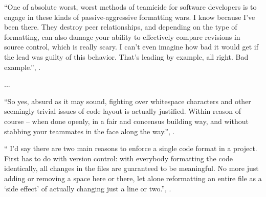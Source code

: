 \begin{enumerate}[leftmargin=*]
        \begin{myquote}
        ``One of absolute worst, worst methods of teamicide for software developers is to engage
        in these kinds of passive-aggressive formatting wars. I know because I've been there.
        They destroy peer relationships, and depending on the type of formatting, can also damage
        your ability to effectively compare revisions in source control, which is really scary.
        I can't even imagine how bad it would get if the lead was guilty of this behavior. That's
        leading by example, all right. Bad example.'', \cite{Atwood}.
        \end{myquote}
        \vspace{-5mm}
        ...
        \begin{myquote}
        ``So yes, absurd as it may sound, fighting over whitespace characters and other seemingly
        trivial issues of code layout is actually justified. Within reason of course -- when done
        openly, in a fair and concensus building way, and without stabbing your teammates in the
        face along the way.'', \cite{Atwood}.
        \end{myquote}

        \begin{myquote}``
        I'd say there are two main reasons to enforce a single code format in a project. First has to
        do with version control: with everybody formatting the code identically, all changes in the
        files are guaranteed to be meaningful. No more just adding or removing a space here or there,
        let alone reformatting an entire file as a `side effect' of actually changing just a line or
        two.'', \cite{Geukens}.
        \end{myquote}

    \end{enumerate}





